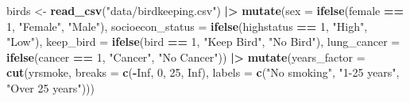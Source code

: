 \documentclass[
]{krantz}
\newenvironment{Shaded}{\begin{snugshade}}{\end{snugshade}}
\newcommand{\AttributeTok}[1]{\textcolor[rgb]{0.27,0.27,0.27}{#1}}
\newcommand{\ConstantTok}[1]{\textcolor[rgb]{0.37,0.37,0.37}{#1}}
\newcommand{\DecValTok}[1]{\textcolor[rgb]{0.06,0.06,0.06}{#1}}
\newcommand{\FunctionTok}[1]{\textcolor[rgb]{0.27,0.27,0.27}{\textbf{#1}}}
\newcommand{\NormalTok}[1]{#1}
\newcommand{\OtherTok}[1]{\textcolor[rgb]{0.37,0.37,0.37}{#1}}
\newcommand{\SpecialCharTok}[1]{\textcolor[rgb]{0.43,0.43,0.43}{\textbf{#1}}}
\newcommand{\StringTok}[1]{\textcolor[rgb]{0.5,0.5,0.5}{#1}}
\begin{document}
\begin{Shaded}
\begin{Highlighting}[]
\NormalTok{birds }\OtherTok{\textless{}{-}} \FunctionTok{read\_csv}\NormalTok{(}\StringTok{"data/birdkeeping.csv"}\NormalTok{) }\SpecialCharTok{|\textgreater{}}
  \FunctionTok{mutate}\NormalTok{(}\AttributeTok{sex =} \FunctionTok{ifelse}\NormalTok{(female }\SpecialCharTok{==} \DecValTok{1}\NormalTok{, }\StringTok{"Female"}\NormalTok{, }\StringTok{"Male"}\NormalTok{),}
         \AttributeTok{socioecon\_status =} \FunctionTok{ifelse}\NormalTok{(highstatus }\SpecialCharTok{==} \DecValTok{1}\NormalTok{, }
                                   \StringTok{"High"}\NormalTok{, }\StringTok{"Low"}\NormalTok{),}
         \AttributeTok{keep\_bird =} \FunctionTok{ifelse}\NormalTok{(bird }\SpecialCharTok{==} \DecValTok{1}\NormalTok{, }\StringTok{"Keep Bird"}\NormalTok{, }\StringTok{"No Bird"}\NormalTok{),}
         \AttributeTok{lung\_cancer =} \FunctionTok{ifelse}\NormalTok{(cancer }\SpecialCharTok{==} \DecValTok{1}\NormalTok{, }\StringTok{"Cancer"}\NormalTok{, }
                              \StringTok{"No Cancer"}\NormalTok{)) }\SpecialCharTok{|\textgreater{}}
  \FunctionTok{mutate}\NormalTok{(}\AttributeTok{years\_factor =} \FunctionTok{cut}\NormalTok{(yrsmoke, }
                            \AttributeTok{breaks =} \FunctionTok{c}\NormalTok{(}\SpecialCharTok{{-}}\ConstantTok{Inf}\NormalTok{, }\DecValTok{0}\NormalTok{, }\DecValTok{25}\NormalTok{, }\ConstantTok{Inf}\NormalTok{),}
            \AttributeTok{labels =} \FunctionTok{c}\NormalTok{(}\StringTok{"No smoking"}\NormalTok{, }\StringTok{"1{-}25 years"}\NormalTok{, }
                       \StringTok{"Over 25 years"}\NormalTok{)))}
\end{Highlighting}
\end{Shaded}
\end{document}
